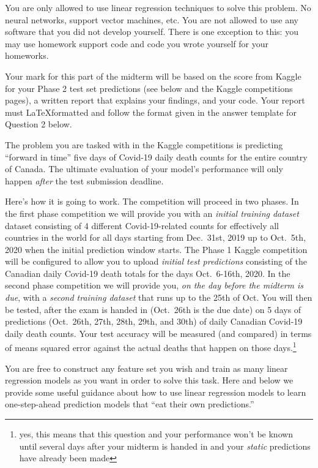 You are only allowed to use linear regression techniques to solve this problem.  No neural networks, support vector machines, etc.  You are not allowed to use any software that you did not develop yourself.  There is one exception to this: you may use homework support code and code you wrote yourself for your homeworks.

Your mark for this part of the midterm will be based on the score from Kaggle for your Phase 2 test set predictions (see below and the Kaggle competitions pages), a written report that explains your findings, and your code. Your report must \LaTeX formatted and follow the format given in the answer template for Question 2 below.

The problem you are tasked with in the Kaggle competitions is predicting ``forward in time'' five days of Covid-19 daily death counts for the entire country of Canada. The ultimate evaluation of your model's performance will only happen {\em after} the test submission deadline.

Here's how it is going to work.  The competition will proceed in two phases.   In the first phase competition we will provide you with an {\em initial training dataset} dataset consisting of 4 different Covid-19-related counts for effectively all countries in the world for all days starting from Dec.~31st, 2019 up to Oct.~5th, 2020 when the initial prediction window starts.  The Phase 1 Kaggle competition will be configured to allow you to upload {\em initial test predictions} consisting of the Canadian daily Covid-19 death totals for the days Oct.~6-16th, 2020.  In the second phase competition we will provide you, {\em  on the day before the midterm is due}, with a {\em second training dataset} that runs up to the 25th of Oct.  You will then be tested, after the exam is handed in 
(Oct.~26th is the due date) on 5 days of predictions (Oct.~26th, 27th, 28th, 29th, and 30th) of daily Canadian Covid-19 daily death counts.  Your test accuracy will be measured (and compared) in terms of means squared error against the actual deaths that happen on those days.\footnote{yes, this means that this question and your performance won't be known until several days after your midterm is handed in and your {\em static} predictions have already been made}

You are free to construct any feature set you wish and train as many linear regression models as you want in order to solve this task.  Here and below we provide some useful guidance about how to use linear regression models to learn one-step-ahead prediction models that ``eat their own predictions.''

